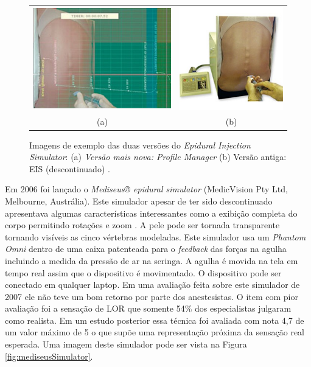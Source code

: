 \begin{figure}[ht!]
    \centering
        \begin{tabular}{cc}
        \includegraphics[width=0.4\linewidth]{capitulos/figuras/epiduralInjectionSimulatorPM.jpg} & 
        \includegraphics[width=0.3\linewidth]{capitulos/figuras/epiduralInjectionSimulator.jpg} 
        \\
        (a) & (b)
        \end{tabular}
    \caption{Imagens de exemplo das duas versões do \textit{Epidural Injection Simulator}: (a) \textit{Versão mais nova: Profile Manager} (b) Versão antiga: EIS (descontinuado)  \cite{CPRSavers&FirstAidSupply2018}.}
    \label{fig:EpiduralInjectionSimulator}
\end{figure}

Em 2006 foi lançado o \textit{Mediseus® epidural simulator} (MedicVision Pty Ltd, Melbourne, Austrália). Este simulador apesar de ter sido descontinuado apresentava algumas características interessantes como a exibição completa do corpo permitindo rotações e zoom \cite{Mayooran2006}. A pele pode ser tornada transparente tornando visíveis as cinco vértebras modeladas. Este simulador usa um \textit{Phantom Omni} dentro de uma caixa patenteada \cite{Brien2007} para o \textit{feedback} das forças na agulha incluindo a medida da pressão de ar na seringa. A agulha é movida na tela em tempo real assim que o dispositivo é movimentado. O dispositivo pode ser conectado em qualquer laptop. Em uma avaliação feita sobre este simulador de 2007 \cite{Elks2007} ele não teve um bom retorno por parte dos anestesistas. O item com pior avaliação foi a sensação de LOR que somente 54\% dos especialistas julgaram como realista. Em um estudo posterior \cite{Lee2012} essa técnica foi avaliada com nota 4,7 de um valor máximo de 5 o que supõe uma representação próxima da sensação real esperada. Uma imagem deste simulador pode ser vista na Figura \ref{fig:mediseusSimulator}.


